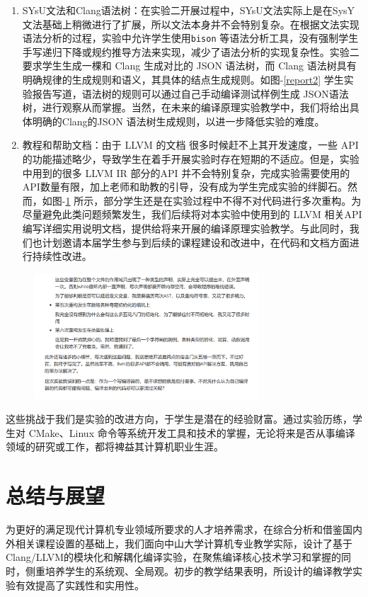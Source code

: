\documentclass{SCIS2020cn}
\begin{document}
\begin{enumerate}
    \item SYsU文法和Clang语法树：在实验二开展过程中，SYsU文法实际上是在SysY文法基础上稍微进行了扩展，所以文法本身并不会特别复杂。在根据文法实现语法分析的过程，实验中允许学生使用\texttt{bison} 等语法分析工具，没有强制学生手写递归下降或规约推导方法来实现，减少了语法分析的实现复杂性。实验二要求学生生成一棵和 Clang 生成对比的 JSON 语法树，而 Clang 语法树具有明确规律的生成规则和语义，其具体的结点生成规则。如图-\ref{report2} 学生实验报告写道，语法树的规则可以通过自己手动编译测试样例生成 JSON语法树，进行观察从而掌握。当然，在未来的编译原理实验教学中，我们将给出具体明确的Clang的JSON 语法树生成规则，以进一步降低实验的难度。
    \item 教程和帮助文档：由于 LLVM 的文档 \cite{llvm_newpass} 很多时候赶不上其开发速度，一些 API 的功能描述略少，导致学生在着手开展实验时存在短期的不适应。但是，实验中用到的很多 LLVM IR 部分的API 并不会特别复杂，完成实验需要使用的API数量有限，加上老师和助教的引导，没有成为学生完成实验的绊脚石。然而，如图-\ref{complain} 所示，部分学生还是在实验过程中不得不对代码进行多次重构。为尽量避免此类问题频繁发生，我们后续将对本实验中使用到的 LLVM 相关API编写详细实用说明文档，提供给将来开展的编译原理实验教学。与此同时，我们也计划邀请本届学生参与到后续的课程建设和改进中，在代码和文档方面进行持续性改进。
\end{enumerate}

\begin{figure}
    \centering
    \includegraphics[width=0.75\textwidth]{assets/image/report}
    \label{complain}
\end{figure}

这些挑战于我们是实验的改进方向，于学生是潜在的经验财富。通过实验历练，学生对 CMake、Linux 命令等系统开发工具和技术的掌握，无论将来是否从事编译领域的研究或工作，都将裨益其计算机职业生涯。

\section{总结与展望}
为更好的满足现代计算机专业领域所要求的人才培养需求，在综合分析和借鉴国内外相关课程设置的基础上，我们面向中山大学计算机专业教学实际，设计了基于Clang/LLVM的模块化和解耦化编译实验，在聚焦编译核心技术学习和掌握的同时，侧重培养学生的系统观、全局观。初步的教学结果表明，所设计的编译教学实验有效提高了实践性和实用性。
\end{document}
